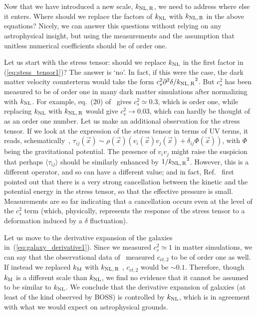 \documentclass[12pt,a4paper]{article}
\newcommand{\dd}{\partial}
\renewcommand{\(}{\left(}
\renewcommand{\)}{\right)}
\def\knl{{k_{\rm NL}}}
\def\km{{k_{\rm M}}}
\def\knlr{{k_{\rm NL,\,R}}}
\begin{document}
Now that we have introduced a new scale, $\knlr$, we need to address where else it enters. Where should we replace the factors of $\knl$ with $\knlr$ in the above equations? Nicely, we can answer this questions without relying on any astrophysical insight, but using the measurements and the assumption that unitless numerical coefficients should be {of} order one. 

Let us start with the stress tensor: should we replace $\knl$ in the first factor in (\ref{eq:stess_tensor1})? The answer is `no'. In fact, if this were the case, the dark matter velocity counterterm would take the form $c_s^2\dd^2\delta/\knlr^2$. But $c_s^2$ has been measured to be {of} order one in many dark matter simulations after normalizing with $\knl$. For example, eq.~(20) of~\cite{Foreman:2015lca} gives $c_s^2\simeq 0.3$, which is order one, while replacing $\knl$ with $\knlr$ would give $c_s^2\to 0.03$, which can hardly be thought of as an order one number. Let us make an additional observation for the stress tensor. If we look at the expression of the stress tensor in terms of UV terms, it reads, schematically~\cite{Baumann:2010tm}, $\tau_{ij}(\vec x)\sim \rho(\vec x) \left(v_i(\vec x)v_{j}(\vec x)+\delta_{ij} \Phi(\vec x)\right)$, with $\Phi$ being the gravitational potential. The presence of $v_iv_j$ might raise the suspicion that perhaps $\langle\tau_{ij}\rangle$ should be similarly enhanced by $1/\knlr^2$. However, this is a different operator, and so can have a different value; and in fact, Ref.~\cite{Baumann:2010tm} first pointed out that there is a very strong cancellation between the kinetic and the potential energy in the stress tensor, so that the effective pressure is small. Measurements are so far indicating that a cancellation occurs even at the level of the $c_s^2$ term (which, physically, represents the response of the stress tensor to a deformation induced by a $\delta$ fluctuation).

Let us move to the derivative expansion of the galaxies in~(\ref{eq:galaxy_derivative1}). Since we measured $c_s^2\simeq 1$ in matter simulations, we can say that the observational data of~\cite{DAmico:2019fhj,Colas:2019ret} measured $c_{ct,2}$ to be {of} order one as well. If instead we replaced $\km$ with $\knlr$ {, $c_{ct,2}$ would be $\sim 0.1$.} Therefore, though $\km$ is a different scale than $\knl$, we find no evidence that it cannot be assumed to be similar to $\knl$. We conclude that the derivative expansion of galaxies ({at least} of the kind observed by BOSS) is controlled by $\knl$, which is in agreement with what we would expect on astrophysical grounds.
\end{document}
